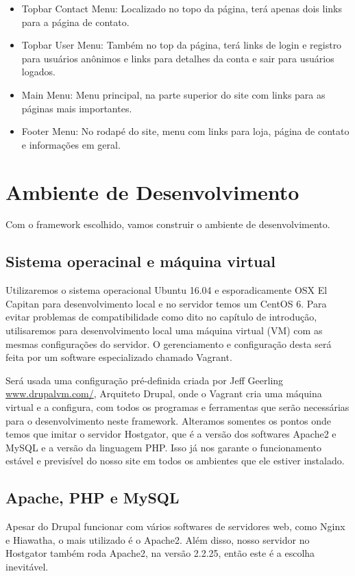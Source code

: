 \begin{itemize}
  \item Topbar Contact Menu: Localizado no topo da página, terá apenas dois links para a página de contato.
  \item Topbar User Menu: Também no top da página, terá links de login e registro para usuários anônimos e links para detalhes da conta e sair para usuários logados.
  \item Main Menu: Menu principal, na parte superior do site com links para as páginas mais importantes.
  \item Footer Menu: No rodapé do site, menu com links para loja, página de contato e informações em geral.
\end{itemize}


\section{Ambiente de Desenvolvimento}

Com o framework escolhido, vamos construir o ambiente de desenvolvimento. 

\subsection{Sistema operacinal e máquina virtual} 
Utilizaremos o sistema operacional Ubuntu 16.04 e esporadicamente OSX El Capitan para desenvolvimento local e no servidor temos um CentOS 6. Para evitar problemas de compatibilidade como dito no capítulo de introdução, utilisaremos para desenvolvimento local uma máquina virtual (VM) com as mesmas configurações do servidor. O gerenciamento e configuração desta será feita por um software especializado chamado Vagrant.

Será usada uma configuração pré-definida criada por Jeff Geerling \url{www.drupalvm.com/}, Arquiteto Drupal, onde o Vagrant cria uma máquina virtual e a configura, com todos os programas e ferramentas que serão necessárias para o desenvolvimento neste framework. Alteramos somentes os pontos onde temos que imitar o servidor Hostgator, que é a versão dos softwares Apache2 e MySQL e a versão da linguagem PHP. Isso já nos garante o funcionamento estável e previsível do nosso site em todos os ambientes que ele estiver instalado.

\subsection{Apache, PHP e MySQL}
Apesar do Drupal funcionar com vários softwares de servidores web, como Nginx e Hiawatha, o mais utilizado é o Apache2. Além disso, nosso servidor no Hostgator também roda Apache2, na versão 2.2.25, então este é a escolha inevitável. 

